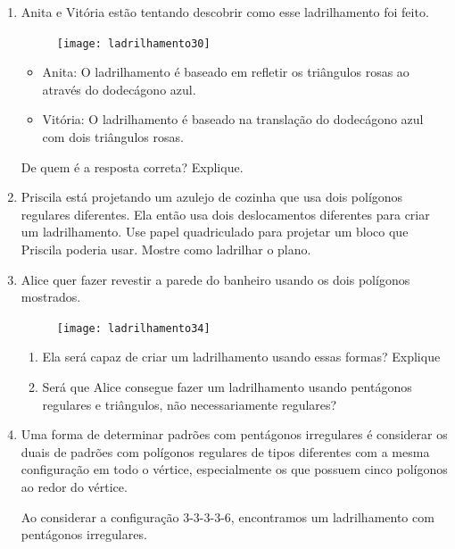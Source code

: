\begin{enumerate}

	\item Anita e Vitória estão tentando descobrir como esse ladrilhamento foi feito.

	\begin{figure}[H]
	\centering
	\texttt{[image: ladrilhamento30]}

	\end{figure}

	\begin{itemize}
	\item Anita: O ladrilhamento é baseado em refletir os triângulos rosas ao através do dodecágono azul.
	\item Vitória: O ladrilhamento é baseado na translação do dodecágono azul com dois triângulos rosas.
	\end{itemize}

	De quem é a resposta correta? Explique.


	\item Priscila está projetando um azulejo de cozinha que usa dois polígonos regulares diferentes. Ela então usa dois deslocamentos diferentes para criar um ladrilhamento. Use papel quadriculado para projetar um bloco que Priscila poderia usar. Mostre como ladrilhar o plano.

	\item Alice quer fazer revestir a parede do banheiro usando os dois polígonos mostrados.

	\begin{figure}[H]
	\centering
	\texttt{[image: ladrilhamento34]}

	\end{figure}

	\begin{enumerate}
		\item Ela será capaz de criar um ladrilhamento usando essas formas? Explique
\item Será que Alice consegue fazer um ladrilhamento usando pentágonos regulares e triângulos, não necessariamente regulares?
	\end{enumerate}
	
	
	\item Uma forma de determinar padrões com pentágonos irregulares é considerar os duais de padrões com polígonos regulares de tipos diferentes com a mesma configuração em todo o vértice, especialmente os que possuem cinco polígonos ao redor do vértice.

Ao considerar a configuração 3-3-3-3-6, encontramos um ladrilhamento com pentágonos irregulares.


\end{enumerate}
